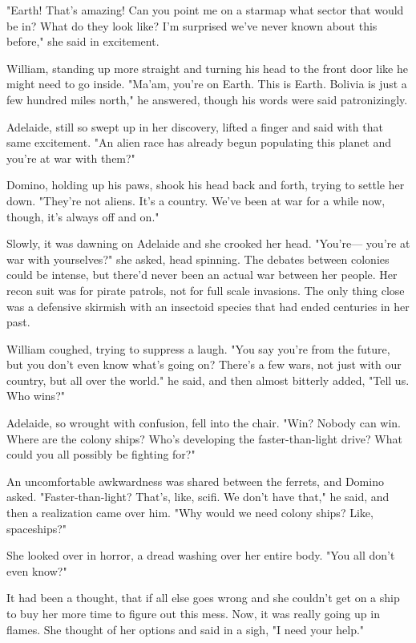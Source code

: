 "Earth! That's amazing! Can you point me on a starmap what sector that would be in? What do they look like? I'm surprised we've never known about this before," she said in excitement.

William, standing up more straight and turning his head to the front door like he might need to go inside. "Ma'am, you're on Earth. This is Earth. Bolivia is just a few hundred miles north," he answered, though his words were said patronizingly.

Adelaide, still so swept up in her discovery, lifted a finger and said with that same excitement. "An alien race has already begun populating this planet and you're at war with them?"

Domino, holding up his paws, shook his head back and forth, trying to settle her down. "They're not aliens. It's a country. We've been at war for a while now, though, it's always off and on."

Slowly, it was dawning on Adelaide and she crooked her head. "You're--- you're at war with yourselves?" she asked, head spinning. The debates between colonies could be intense, but there'd never been an actual war between her people. Her recon suit was for pirate patrols, not for full scale invasions. The only thing close was a defensive skirmish with an insectoid species that had ended centuries in her past.

William coughed, trying to suppress a laugh. "You say you're from the future, but you don't even know what's going on? There's a few wars, not just with our country, but all over the world." he said, and then almost bitterly added, "Tell us. Who wins?"

Adelaide, so wrought with confusion, fell into the chair. "Win? Nobody can win. Where are the colony ships? Who's developing the faster-than-light drive? What could you all possibly be fighting for?"

An uncomfortable awkwardness was shared between the ferrets, and Domino asked. "Faster-than-light? That's, like, scifi. We don't have that," he said, and then a realization came over him. "Why would we need colony ships? Like, spaceships?"

She looked over in horror, a dread washing over her entire body. "You all don't even know?"

It had been a thought, that if all else goes wrong and she couldn't get on a ship to buy her more time to figure out this mess. Now, it was really going up in flames. She thought of her options and said in a sigh, "I need your help."

